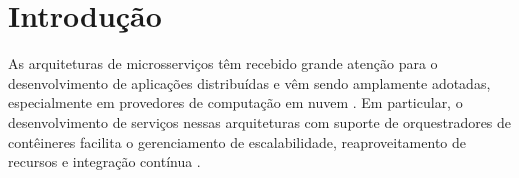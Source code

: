 \chapter{Introdução}
\label{intro}






As arquiteturas de microsserviços têm recebido grande atenção para o desenvolvimento de aplicações distribuídas e vêm sendo amplamente adotadas, especialmente em provedores de computação em nuvem \cite{aguilera2020microsecond, netto2020incorporating, tai2016continuous, moghaddam2016simple, nguyen2020toward, gabbrielli2016self, toffetti2015architecture, oliveira2016evaluating}. Em particular, o desenvolvimento de serviços nessas arquiteturas com suporte de orquestradores de contêineres facilita o gerenciamento de escalabilidade, reaproveitamento de recursos e integração contínua \cite{ghofrani2018challenges}.

